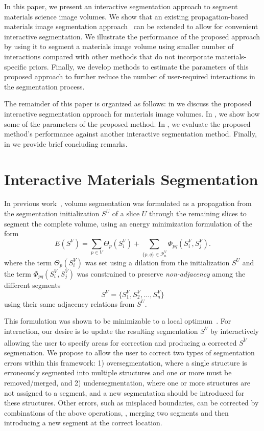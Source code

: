 \documentclass[]{spie}  %
\begin{document}
In this paper, we present an interactive segmentation approach to
segment materials science image volumes.  We show that an existing
propagation-based materials image segmentation
approach~\cite{waggoner:11} can be extended to allow for convenient
interactive segmentation.  We illustrate the performance of the
proposed approach by using it to segment a materials image volume
using smaller number of interactions compared with other methods that
do not incorporate materials-specific priors.  Finally, we develop
methods to estimate the parameters of this proposed approach to
further reduce the number of user-required interactions in the
segmentation process.

The remainder of this paper is organized as follows: in
 we discuss the proposed interactive segmentation
approach for materials image volumes. In , we show how
some of the parameters of the proposed method.  In , we
evaluate the proposed method's performance against another interactive
segmentation method.  Finally, in  we provide brief
concluding remarks.

\section{Interactive Materials Segmentation}
\label{sec:interactive}

In previous work~\cite{waggoner:11}, volume segmentation was
formulated as a propagation from the segmentation initialization $S^U$
of a slice $U$ through the remaining slices to segment the complete
volume, using an energy minimization formulation of the form
\begin{equation}
  E( S^V ) = \sum_{p\in V}\Theta_p(S^V_i) + 
  \sum_{\{p,q\}\in\mathcal{P}^V_n} \Phi_{pq}(S_i^V , S_j^V) .
\label{eq:energy1}
\end{equation}
where the \data{} term $\Theta_p(S^V_i)$ was set using a dilation from
the initialization $S^U$ and the \smooth{} term $\Phi_{pq}(S_i^V ,
S_j^V)$ was constrained to preserve \emph{non-adjacency} among the
different segments
\[S^V = \{ S^V_1, S^V_2, \ldots, S^V_n \} \] using their same
adjacency relations from $S^U$.

This formulation was shown to be minimizable to a local
optimum~\cite{veksler:99, boykov:01}.  For interaction, our desire is
to update the resulting segmentation $S^V$ by interactively allowing
the user to specify areas for correction and producing a corrected
$S^{\tilde{V}}$ segmenation.  We propose to allow the user to correct two
types of segmentation errors within this framework: 1)
oversegmentation, where a single structure is erroneously segmented
into multiple structures and one or more must be removed/merged, and
2) undersegmentation, where one or more structures are not assigned to
a segment, and a new segmentation should be introduced for these
structures.  Other errors, such as misplaced boundaries, can be
corrected by combinations of the above operations, \eg, merging two
segments and then introducing a new segment at the correct location.
\end{document}
